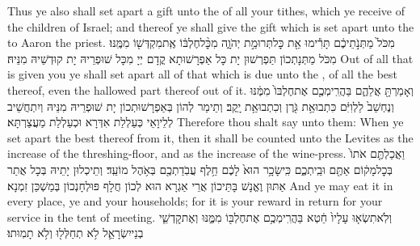 {Thus ye also shall set apart a gift unto the \lord\space of all your tithes, which ye receive of the children of Israel; and thereof ye shall give the gift which is set apart unto the \lord\space to Aaron the priest.}{}
{מִכֹּל֙ מַתְּנֹ֣תֵיכֶ֔ם תָּרִ֕ימוּ אֵ֖ת כׇּל\maqqaf תְּרוּמַ֣ת יְהֹוָ֑ה מִכׇּ֨ל\maqqaf חֶלְבּ֔וֹ אֶֽת\maqqaf מִקְדְּשׁ֖וֹ מִמֶּֽנּוּ׃}
{מִכֹּל מַתְּנָתְכוֹן תַּפְרְשׁוּן יָת כָּל אַפְרָשׁוּתָא קֳדָם יְיָ מִכָּל שׁוּפְרֵיהּ יָת קוּדְשֵׁיהּ מִנֵּיהּ׃}
{Out of all that is given you ye shall set apart all of that which is due unto the \lord, of all the best thereof, even the hallowed part thereof out of it.}{}
{וְאָמַרְתָּ֖ אֲלֵהֶ֑ם בַּהֲרִֽימְכֶ֤ם אֶת\maqqaf חֶלְבּוֹ֙ מִמֶּ֔נּוּ וְנֶחְשַׁב֙ לַלְוִיִּ֔ם כִּתְבוּאַ֥ת גֹּ֖רֶן וְכִתְבוּאַ֥ת יָֽקֶב׃}
{וְתֵימַר לְהוֹן בְּאַפְרָשׁוּתְכוֹן יָת שׁוּפְרֵיהּ מִנֵּיהּ וְיִתְחֲשֵׁיב לְלֵיוָאֵי כְּעַלְלַת אִדְּרָא וּכְעַלְלַת מַעֲצַרְתָּא׃}
{Therefore thou shalt say unto them: When ye set apart the best thereof from it, then it shall be counted unto the Levites as the increase of the threshing-floor, and as the increase of the wine-press.}{}
{וַאֲכַלְתֶּ֤ם אֹתוֹ֙ בְּכׇל\maqqaf מָק֔וֹם אַתֶּ֖ם וּבֵֽיתְכֶ֑ם כִּֽי\maqqaf שָׂכָ֥ר הוּא֙ לָכֶ֔ם חֵ֥לֶף עֲבֹֽדַתְכֶ֖ם בְּאֹ֥הֶל מוֹעֵֽד׃}
{וְתֵיכְלוּן יָתֵיהּ בְּכָל אֲתַר אַתּוּן וֶאֱנָשׁ בָּתֵּיכוֹן אֲרֵי אַגְרָא הוּא לְכוֹן חֲלָף פּוּלְחָנְכוֹן בְּמַשְׁכַּן זִמְנָא׃}
{And ye may eat it in every place, ye and your households; for it is your reward in return for your service in the tent of meeting.}{}
{וְלֹֽא\maqqaf תִשְׂא֤וּ עָלָיו֙ חֵ֔טְא בַּהֲרִֽימְכֶ֥ם אֶת\maqqaf חֶלְבּ֖וֹ מִמֶּ֑נּוּ וְאֶת\maqqaf קׇדְשֵׁ֧י בְנֵי\maqqaf יִשְׂרָאֵ֛ל לֹ֥א תְחַלְּל֖וּ וְלֹ֥א תָמֽוּתוּ׃ \petucha }
